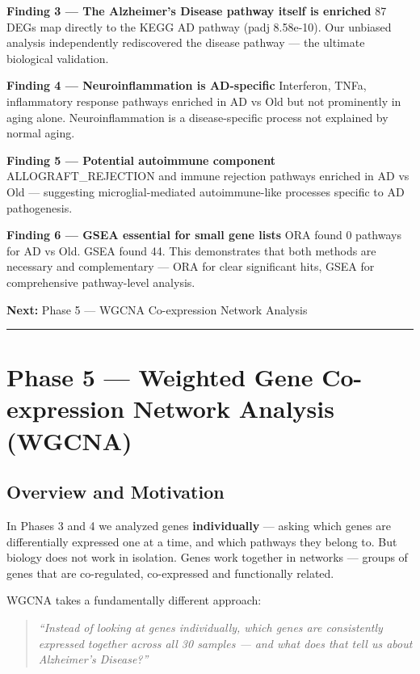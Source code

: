 \documentclass[
]{article}
\begin{document}
\textbf{Finding 3 --- The Alzheimer's Disease pathway itself is
enriched} 87 DEGs map directly to the KEGG AD pathway (padj 8.58e-10).
Our unbiased analysis independently rediscovered the disease pathway ---
the ultimate biological validation.

\textbf{Finding 4 --- Neuroinflammation is AD-specific} Interferon,
TNFa, inflammatory response pathways enriched in AD vs Old but not
prominently in aging alone. Neuroinflammation is a disease-specific
process not explained by normal aging.

\textbf{Finding 5 --- Potential autoimmune component}
ALLOGRAFT\_REJECTION and immune rejection pathways enriched in AD vs Old
--- suggesting microglial-mediated autoimmune-like processes specific to
AD pathogenesis.

\textbf{Finding 6 --- GSEA essential for small gene lists} ORA found 0
pathways for AD vs Old. GSEA found 44. This demonstrates that both
methods are necessary and complementary --- ORA for clear significant
hits, GSEA for comprehensive pathway-level analysis.

\textbf{Next:} Phase 5 --- WGCNA Co-expression Network Analysis

\begin{center}\rule{0.5\linewidth}{0.5pt}\end{center}

\section{Phase 5 --- Weighted Gene Co-expression Network Analysis
(WGCNA)}\label{phase-5-weighted-gene-co-expression-network-analysis-wgcna}

\subsection{Overview and Motivation}\label{overview-and-motivation}

In Phases 3 and 4 we analyzed genes \textbf{individually} --- asking
which genes are differentially expressed one at a time, and which
pathways they belong to. But biology does not work in isolation. Genes
work together in networks --- groups of genes that are co-regulated,
co-expressed and functionally related.

WGCNA takes a fundamentally different approach:

\begin{quote}
\emph{``Instead of looking at genes individually, which genes are
consistently expressed together across all 30 samples --- and what does
that tell us about Alzheimer's Disease?''}
\end{quote}
\end{document}
